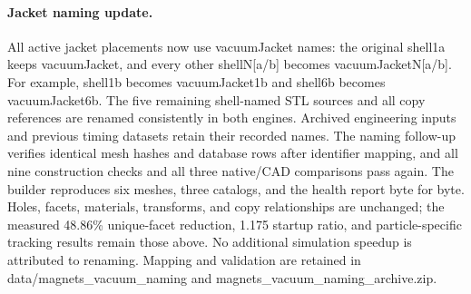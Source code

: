 \paragraph{Jacket naming update.}
All active jacket placements now use vacuumJacket names: the original shell1a keeps vacuumJacket, and every
other shellN[a/b] becomes vacuumJacketN[a/b]. For example, shell1b becomes vacuumJacket1b and shell6b becomes
vacuumJacket6b. The five remaining shell-named STL sources and all copy references are renamed consistently in
both engines. Archived engineering inputs and previous timing datasets retain their recorded names. The naming
follow-up verifies identical mesh hashes and database rows after identifier mapping, and all nine construction
checks and all three native/CAD comparisons pass again. The builder reproduces six meshes, three catalogs, and
the health report byte for byte. Holes, facets, materials, transforms, and copy relationships are unchanged;
the measured 48.86\% unique-facet reduction, 1.175 startup ratio, and particle-specific tracking results
remain those above. No additional simulation speedup is attributed to renaming. Mapping and validation are
retained in data/magnets\_vacuum\_naming and magnets\_vacuum\_naming\_archive.zip.
